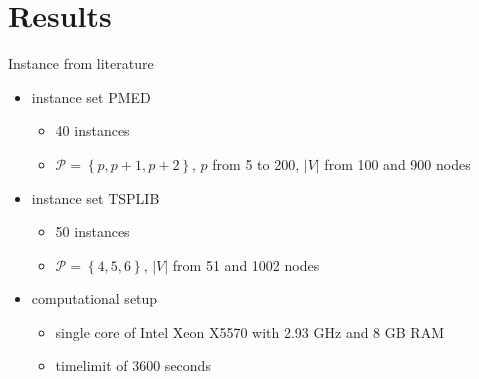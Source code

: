 \documentclass[utf8,aspectratio=1610,ngerman,english]{beamer}
\renewcommand{\emph}[1]{\textcolor{jkuGreen}{#1}}
\begin{document}
\section{Results}
\begin{frame}{Instance from literature}
    \vspace*{-2pt}
    \begin{itemize}
        \item instance set \emph{PMED} %
              \begin{itemize}
                  \item 40 instances
                  \item $\mathcal P = \left \{p, p+1, p+2\right \}$, $p$ from 5 to 200, $\left|V\right|$ from 100 and 900 nodes
              \end{itemize} \pause
        \item instance set \emph{TSPLIB} %
              \begin{itemize}
                  \item 50 instances
                  \item $\mathcal P = \left \{4, 5, 6\right \}$, $\left|V\right|$ from 51 and 1002 nodes
              \end{itemize}\pause
        \item computational setup
              \begin{itemize}
                  \item single core of Intel Xeon X5570 with 2.93 GHz and 8 GB RAM
                  \item \emph{timelimit} of 3600 seconds
              \end{itemize}
    \end{itemize}
\end{frame}

\end{document}
